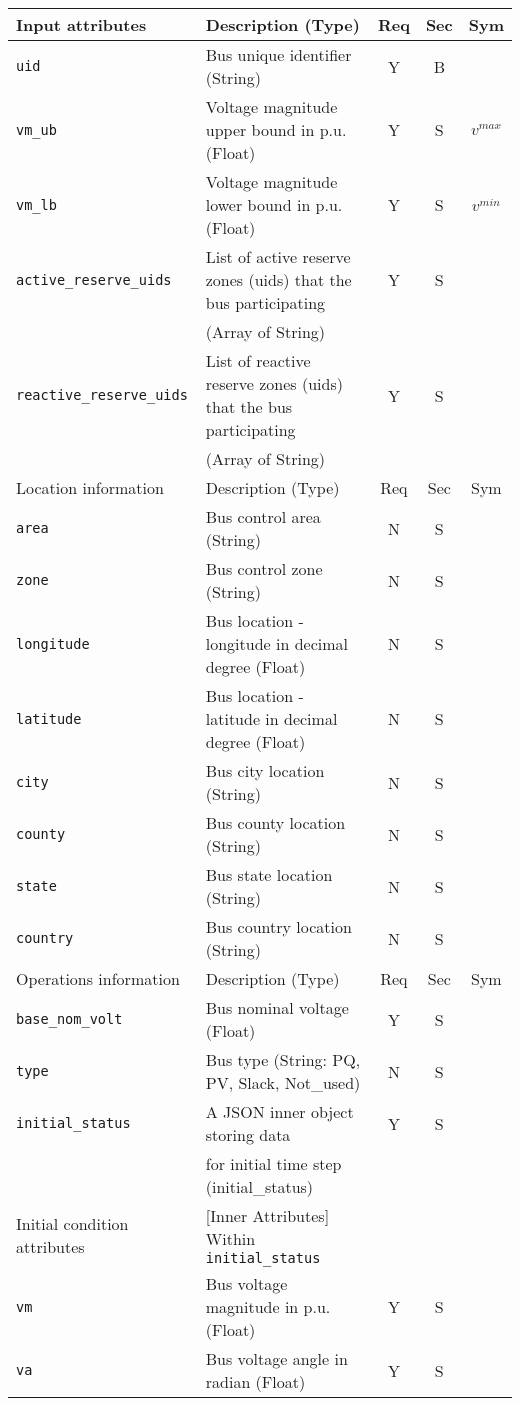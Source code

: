 \documentclass{article}
\begin{document}
\begin{center}
\small
\begin{tabular}{ l | l | c | c | c |}
Input attributes & Description (Type) & Req & Sec & Sym\\
\hline
  {\tt uid} & Bus unique identifier (String)& Y & B &  \\
  {\tt vm\_ub} & Voltage magnitude upper bound in p.u. (Float)& Y & S & $v^{max}$\\
  {\tt vm\_lb} & Voltage magnitude lower bound in p.u. (Float)& Y & S & $v^{min}$\\
  {\tt active\_reserve\_uids} & List of active reserve zones (uids) that the bus participating & Y & S & \\
                     &  (Array of String) &  & & \\
  {\tt reactive\_reserve\_uids} & List of reactive reserve zones (uids) that the bus participating & Y & S & \\
                     &  (Array of String) &  & & \\
  \hline
  Location information & Description (Type) & Req & Sec & Sym\\
  \hline
  {\tt area} &  Bus control area (String)& N & S & \\
  {\tt zone} &  Bus control zone (String)& N & S & \\
  {\tt longitude} & Bus location - longitude in decimal degree (Float) & N & S & \\
  {\tt latitude} & Bus location - latitude in decimal degree (Float) & N & S & \\
  {\tt city}     & Bus city location (String) & N & S & \\
  {\tt county}     & Bus county location (String) & N & S & \\
  {\tt state}    & Bus state location (String) & N & S & \\
  {\tt country}  & Bus country location (String) & N & S & \\
  \hline
    Operations information & Description (Type) & Req & Sec & Sym\\
  \hline
  {\tt base\_nom\_volt} & Bus nominal voltage (Float) & Y & S & \\
  {\tt type} & Bus type (String: PQ, PV, Slack, Not\_used) & N & S &\\
  {\tt initial\_status} & A JSON inner object storing data  & Y & S &  \\
       & for initial time step (initial\_status) &  &  &  \\
  \hline
  Initial condition attributes & [Inner Attributes] Within {\tt initial\_status} & & & \\
  \hline
  {\tt vm}   & Bus voltage magnitude in p.u. (Float) & Y & S & \\
  {\tt va}   & Bus voltage angle     in radian (Float) & Y & S & \\
  \hline
\end{tabular}
\end{center}\textbf{}
\end{document}
